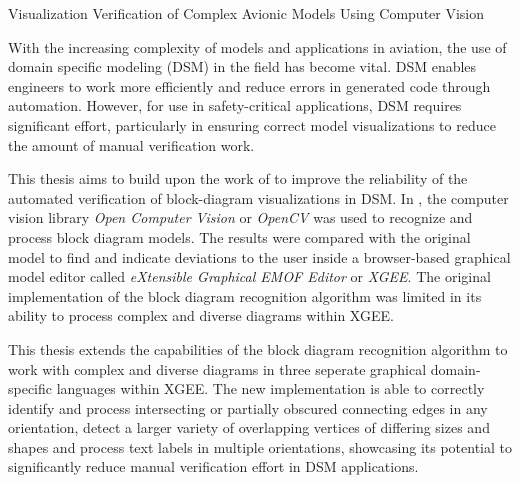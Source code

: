\label{abstract}
{\LARGE Visualization Verification of Complex Avionic Models Using Computer Vision}

With the increasing complexity of models and applications in aviation, the use of domain specific modeling (DSM) in the field has become vital. DSM enables engineers to work more efficiently and reduce errors in generated code through automation. However, for use in safety-critical applications, DSM requires significant effort, particularly in ensuring correct model visualizations to reduce the amount of manual verification work.

This thesis aims to build upon the work of \cite{og_paper} to improve the reliability of the automated verification of block-diagram visualizations in DSM. In \cite{og_paper}, the computer vision library \textit{Open Computer Vision} or \textit{OpenCV} was used to recognize and process block diagram models. The results were compared with the original model to find and indicate deviations to the user inside a browser-based graphical model editor called \textit{eXtensible Graphical EMOF Editor} or \textit{XGEE}.
The original implementation of the block diagram recognition algorithm was limited in its ability to process complex and diverse diagrams within XGEE.

This thesis extends the capabilities of the block diagram recognition algorithm to work with complex and diverse diagrams in three seperate graphical domain-specific languages within XGEE. The new implementation is able to correctly identify and process intersecting or partially obscured connecting edges in any orientation, detect a larger variety of overlapping vertices of differing sizes and shapes and process text labels in multiple orientations, showcasing its potential to significantly reduce manual verification effort in DSM applications.